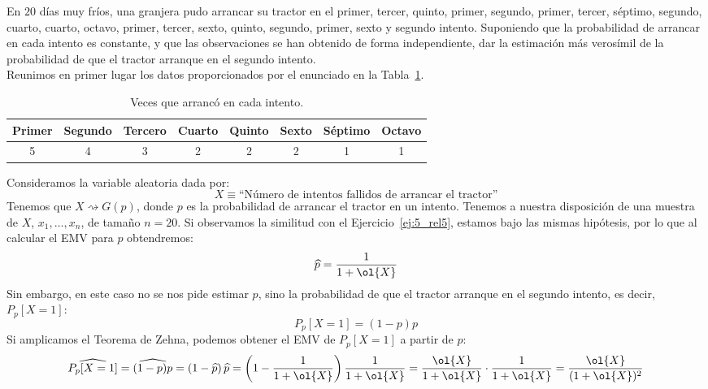 \begin{ejercicio}
    En $20$ días muy fríos, una granjera pudo arrancar su tractor en el primer, tercer, quinto, primer, segundo, primer, tercer, séptimo, segundo, cuarto, cuarto, octavo, primer, tercer, sexto, quinto, segundo, primer, sexto y segundo intento. Suponiendo que la probabilidad de arrancar en cada intento es constante, y que las observaciones se han obtenido de forma independiente, dar la estimación más verosímil de la probabilidad de que el tractor arranque en el segundo intento.\\

    \noindent
    Reunimos en primer lugar los datos proporcionados por el enunciado en la Tabla~\ref{tab:ej6_rel5}.
    \begin{table}[h]
    \centering
    \begin{tabular}{cccccccc}
        Primer & Segundo & Tercero & Cuarto & Quinto & Sexto & Séptimo & Octavo \\
        \hline
        5 & 4 & 3 & 2 & 2 & 2 & 1 & 1
    \end{tabular}
    \caption{Veces que arrancó en cada intento.}
    \label{tab:ej6_rel5}
    \end{table}

    Consideramos la variable aleatoria dada por:
    \begin{equation*}
        X \equiv \text{``Número de intentos fallidos de arrancar el tractor''}
    \end{equation*}
    Tenemos que $X\rightsquigarrow G(p)$, donde $p$ es la probabilidad de arrancar el tractor en un intento. Tenemos a nuestra disposición de una muestra de $X$, $x_1,\ldots, x_n$, de tamaño $n=20$. Si observamos la similitud con el Ejercicio~\ref{ej:5_rel5}, estamos bajo las mismas hipótesis, por lo que al calcular el EMV para $p$ obtendremos:
    \begin{equation*}
        \widehat{p} = \frac{1}{1+\ol{X}}
    \end{equation*}
    Sin embargo, en este caso no se nos pide estimar $p$, sino la probabilidad de que el tractor arranque en el segundo intento, es decir, $P_p[X=1]$:
    \begin{equation*}
        P_p[X = 1] = (1-p)p
    \end{equation*}
    Si amplicamos el Teorema de Zehna, podemos obtener el EMV de $P_p[X=1]$ a partir de $\widehat{p}$:
    \begin{equation*}
        \widehat{P_p[X=1]} = \widehat{(1-p)p} = \left(1-\widehat{p}\right)\widehat{p}
        = \left(1-\frac{1}{1+\ol{X}}\right)\frac{1}{1+\ol{X}} = \frac{\ol{X}}{1+\ol{X}}\cdot \frac{1}{1+\ol{X}} = \frac{\ol{X}}{(1+\ol{X})^2}
    \end{equation*}


\end{ejercicio}
